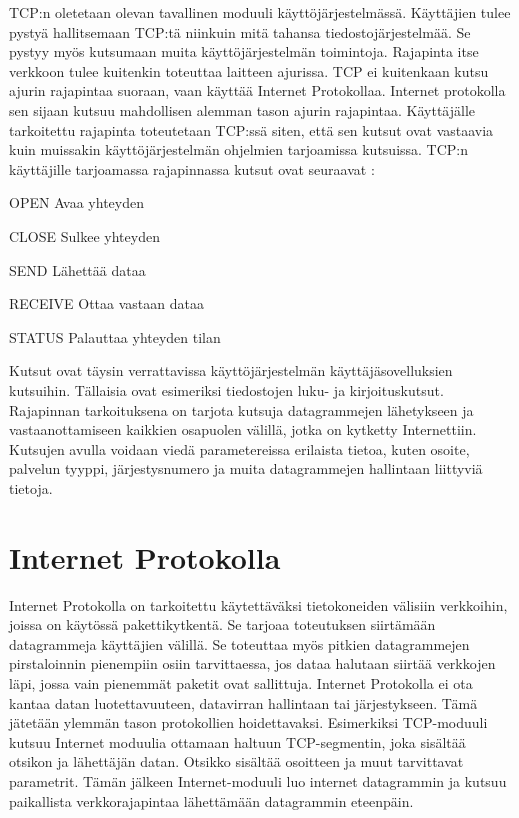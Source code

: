 \documentclass[utf8]{gradu3}
\begin{document}
TCP:n oletetaan olevan tavallinen moduuli käyttöjärjestelmässä. Käyttäjien tulee pystyä hallitsemaan TCP:tä niinkuin mitä tahansa tiedostojärjestelmää. Se pystyy myös kutsumaan muita käyttöjärjestelmän toimintoja. Rajapinta itse verkkoon tulee kuitenkin toteuttaa laitteen ajurissa. TCP ei kuitenkaan kutsu ajurin rajapintaa suoraan, vaan käyttää Internet Protokollaa. Internet protokolla sen sijaan kutsuu mahdollisen alemman tason ajurin rajapintaa. Käyttäjälle tarkoitettu rajapinta toteutetaan TCP:ssä siten, että sen kutsut ovat vastaavia kuin muissakin käyttöjärjestelmän ohjelmien tarjoamissa kutsuissa.  TCP:n käyttäjille tarjoamassa rajapinnassa kutsut ovat seuraavat \parencite{tcp2_3}:

\begin{desclist}
\item[OPEN] Avaa yhteyden
\item[CLOSE] Sulkee yhteyden
\item[SEND] Lähettää dataa
\item[RECEIVE] Ottaa vastaan dataa
\item[STATUS] Palauttaa yhteyden tilan
\end{desclist}

Kutsut ovat täysin verrattavissa käyttöjärjestelmän käyttäjäsovelluksien kutsuihin. Tällaisia ovat esimeriksi tiedostojen luku- ja kirjoituskutsut. Rajapinnan tarkoituksena on tarjota kutsuja datagrammejen lähetykseen ja vastaanottamiseen kaikkien osapuolen välillä, jotka on kytketty Internettiin. Kutsujen avulla voidaan viedä parametereissa erilaista tietoa, kuten osoite, palvelun tyyppi, järjestysnumero ja muita datagrammejen hallintaan liittyviä tietoja. 

\section{Internet Protokolla}

Internet Protokolla on tarkoitettu käytettäväksi tietokoneiden välisiin verkkoihin, joissa on käytössä pakettikytkentä. Se tarjoaa toteutuksen siirtämään datagrammeja käyttäjien välillä. Se toteuttaa myös pitkien datagrammejen pirstaloinnin pienempiin osiin tarvittaessa, jos dataa halutaan siirtää verkkojen läpi, jossa vain pienemmät paketit ovat sallittuja. Internet Protokolla ei ota kantaa datan luotettavuuteen, datavirran hallintaan tai järjestykseen. Tämä jätetään ylemmän tason protokollien hoidettavaksi. Esimerkiksi TCP-moduuli kutsuu Internet moduulia ottamaan haltuun TCP-segmentin, joka sisältää otsikon ja lähettäjän datan. Otsikko sisältää osoitteen ja muut tarvittavat parametrit. Tämän jälkeen Internet-moduuli luo internet datagrammin ja kutsuu paikallista verkkorajapintaa lähettämään datagrammin eteenpäin. \parencite{internet_protocol}
\end{document}
